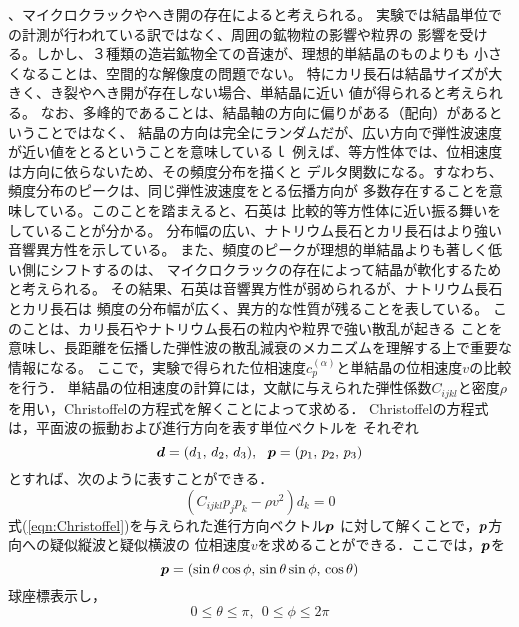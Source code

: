 、マイクロクラックやへき開の存在によると考えられる。
実験では結晶単位での計測が行われている訳ではなく、周囲の鉱物粒の影響や粒界の
影響を受ける。しかし、３種類の造岩鉱物全ての音速が、理想的単結晶のものよりも
小さくなることは、空間的な解像度の問題でない。
特にカリ長石は結晶サイズが大きく、き裂やへき開が存在しない場合、単結晶に近い
値が得られると考えられる。
なお、多峰的であることは、結晶軸の方向に偏りがある（配向）があるということではなく、
結晶の方向は完全にランダムだが、広い方向で弾性波速度が近い値をとるということを意味しているｌ
例えば、等方性体では、位相速度は方向に依らないため、その頻度分布を描くと
デルタ関数になる。すなわち、頻度分布のピークは、同じ弾性波速度をとる伝播方向が
多数存在することを意味している。このことを踏まえると、石英は
比較的等方性体に近い振る舞いをしていることが分かる。
分布幅の広い、ナトリウム長石とカリ長石はより強い音響異方性を示している。
また、頻度のピークが理想的単結晶よりも著しく低い側にシフトするのは、
マイクロクラックの存在によって結晶が軟化するためと考えられる。
その結果、石英は音響異方性が弱められるが、ナトリウム長石とカリ長石は
頻度の分布幅が広く、異方的な性質が残ることを表している。
このことは、カリ長石やナトリウム長石の粒内や粒界で強い散乱が起きる
ことを意味し、長距離を伝播した弾性波の散乱減衰のメカニズムを理解する上で重要な情報になる。
%
%
%
ここで，実験で得られた位相速度$c_p^{(\alpha)}$と単結晶の位相速度$v$の比較を行う．
単結晶の位相速度の計算には，文献に与えられた弾性係数$C_{ijkl}$と密度$\rho$
を用い，Christoffelの方程式を解くことによって求める．
Christoffelの方程式は，平面波の振動および進行方向を表す単位ベクトルを
それぞれ
\begin{equation}
	\fat{d}=(d_1,\, d_2,\, d_3), \ \ 
	\fat{p}=(p_1,\, p_2,\, p_3)
	\label{eqn:unit_vecs}
\end{equation}
とすれば、次のように表すことができる．
\begin{equation}
	\left( C_{ijkl}p_j p_k - \rho v^2 \right)d_k=0
	\label{eqn:Christoffel}
\end{equation}
式(\ref{eqn:Christoffel})を与えられた進行方向ベクトル$\mbox{\boldmath{$p$}}$
に対して解くことで，$\mbox{\boldmath{$p$}}$方向への疑似縦波と疑似横波の
位相速度$v$を求めることができる．ここでは，$\mbox{\boldmath{$p$}}$を
\begin{equation}
	\fat{p}=\left(
		\sin\theta \cos\phi, \,
		\sin\theta \sin\phi, \,
		\cos\theta
	\right)
	\label{eqn:p_polar}
\end{equation}
球座標表示し，
\begin{equation}
	0 \leq \theta \leq \pi, \ \ 
	0 \leq \phi \leq 2\pi
	\label{eqn:}
\end{equation}
